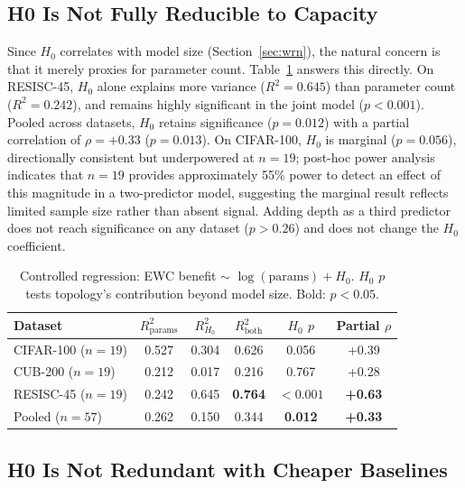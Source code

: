 \documentclass{article}
\begin{document}
\subsection{H0 Is Not Fully Reducible to Capacity}

Since $H_0$ correlates with model size (Section~\ref{sec:wrn}), the natural concern is that it merely proxies for parameter count. Table~\ref{tab:capacity_control} answers this directly. On RESISC-45, $H_0$ alone explains more variance ($R^2 = 0.645$) than parameter count ($R^2 = 0.242$), and remains highly significant in the joint model ($p < 0.001$). Pooled across datasets, $H_0$ retains significance ($p = 0.012$) with a partial correlation of $\rho = +0.33$ ($p = 0.013$). On CIFAR-100, $H_0$ is marginal ($p = 0.056$), directionally consistent but underpowered at $n = 19$; post-hoc power analysis indicates that $n = 19$ provides approximately 55\% power to detect an effect of this magnitude in a two-predictor model, suggesting the marginal result reflects limited sample size rather than absent signal. Adding depth as a third predictor does not reach significance on any dataset ($p > 0.26$) and does not change the $H_0$ coefficient.

\begin{table}[t]
\centering
\caption{Controlled regression: EWC benefit $\sim$ $\log(\text{params}) + H_0$. $H_0$ $p$ tests topology's contribution beyond model size. Bold: $p < 0.05$.}
\label{tab:capacity_control}
\small
\begin{tabular}{@{}lccccc@{}}
\toprule
Dataset & $R^2_{\text{params}}$ & $R^2_{H_0}$ & $R^2_{\text{both}}$ & $H_0$ $p$ & Partial $\rho$ \\
\midrule
CIFAR-100 ($n\!=\!19$)  & 0.527 & 0.304 & 0.626 & 0.056 & +0.39 \\
CUB-200 ($n\!=\!19$)    & 0.212 & 0.017 & 0.216 & 0.767 & +0.28 \\
RESISC-45 ($n\!=\!19$)  & 0.242 & 0.645 & \textbf{0.764} & $\mathbf{< 0.001}$ & \textbf{+0.63} \\
Pooled ($n\!=\!57$)      & 0.262 & 0.150 & 0.344 & \textbf{0.012} & \textbf{+0.33} \\
\bottomrule
\end{tabular}
\end{table}

\subsection{H0 Is Not Redundant with Cheaper Baselines}
\label{sec:baselines}
\end{document}
